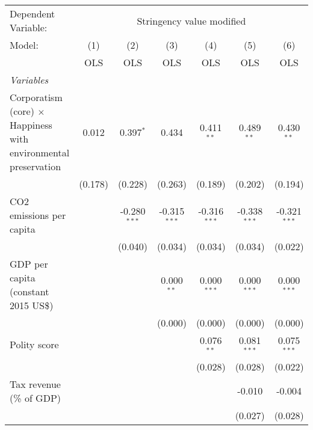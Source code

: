
\begingroup
\centering
\begin{tabular}{lcccccc}
   \toprule
   Dependent Variable: & \multicolumn{6}{c}{Stringency value modified}\\
   Model:                                                                 & (1)     & (2)            & (3)            & (4)            & (5)            & (6)\\  
                                                                          &  OLS    & OLS            & OLS            & OLS            & OLS            & OLS\\  
   \midrule
   \emph{Variables}\\
   Corporatism (core) $\times$ Happiness with environmental preservation  & 0.012   & 0.397$^{*}$    & 0.434          & 0.411$^{**}$   & 0.489$^{**}$   & 0.430$^{**}$\\   
                                                                          & (0.178) & (0.228)        & (0.263)        & (0.189)        & (0.202)        & (0.194)\\   
   CO2 emissions per capita                                               &         & -0.280$^{***}$ & -0.315$^{***}$ & -0.316$^{***}$ & -0.338$^{***}$ & -0.321$^{***}$\\   
                                                                          &         & (0.040)        & (0.034)        & (0.034)        & (0.034)        & (0.022)\\   
   GDP per capita (constant 2015 US\$)                                    &         &                & 0.000$^{**}$   & 0.000$^{***}$  & 0.000$^{***}$  & 0.000$^{***}$\\   
                                                                          &         &                & (0.000)        & (0.000)        & (0.000)        & (0.000)\\   
   Polity score                                                           &         &                &                & 0.076$^{**}$   & 0.081$^{***}$  & 0.075$^{***}$\\   
                                                                          &         &                &                & (0.028)        & (0.028)        & (0.022)\\   
   Tax revenue (\% of GDP)                                                &         &                &                &                & -0.010         & -0.004\\   
                                                                          &         &                &                &                & (0.027)        & (0.028)\\   

\end{tabular}
